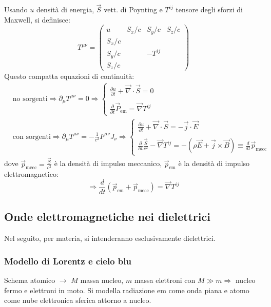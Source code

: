 \documentclass[10pt, a4paper]{scrartcl}
\numberwithin{equation}{subsection}
\theoremstyle{style1}
\begin{document}
Usando $u$ densit\`a di energia, $\vec{S}$ vett. di Poynting e $T^{ij} $ tensore degli sforzi di Maxwell, si definisce:
\begin{equation}
	T^{\mu \nu} = \begin{pmatrix} u & S_x / c & S_y / c & S_z / c\\
S_x / c & & & \\
S_y / c & & -T^{ij} & \\
S_z / c & & & \end{pmatrix}  
\end{equation}
Questo compatta equazioni di continuit\`a:
\begin{equation}
	\begin{split}
		&\text{no sorgenti} \Rightarrow \partial _\mu T^{\mu \nu} =  0 \Rightarrow \begin{cases}
		\displaystyle \frac{\partial u}{\partial t} + \vec{\nabla }\cdot \vec{S}=0\\
		\\
		\displaystyle \frac{\partial }{\partial t} \vec{P}_\text{em}=\vec{\nabla }T^{ij} 
	\end{cases}\\
		&\text{con sorgenti} \Rightarrow \partial _\mu T^{\mu  \nu} = -\frac{1}{c^2} F^{\mu \nu} J_\nu  \Rightarrow  \begin{cases}
			\displaystyle \frac{\partial u}{\partial t} + \vec{\nabla }\cdot \vec{S}= - \vec{j}\cdot \vec{E}\\
			\\
			\displaystyle \frac{\partial }{\partial t} \frac{\vec{S}}{c^2} - \vec{\nabla }T^{ij} = - (\rho \vec{E}+\vec{j}\times \vec{B}) \equiv \frac{d }{d t} \vec{p}_\text{mecc}
		\end{cases}
	\end{split}
\end{equation}
dove $\vec{p}_\text{mecc}=\frac{\vec{S}}{c^2}$ \`e la densit\`a di impulso meccanico, $\vec{p}_\text{em}$ \`e la densit\`a di impulso elettromagnetico:
\begin{equation}
	\Rightarrow \frac{d }{d t} (\vec{p}_\text{em}+\vec{p}_\text{mecc}) = \vec{\nabla }T^{ij} 
\end{equation}
\subsection{Onde elettromagnetiche nei dielettrici}
Nel seguito, per materia, si intenderanno esclusivamente dielettrici.
\subsubsection{Modello di Lorentz e cielo blu}\label{cielo}
Schema atomico $\to$ $M$ massa nucleo, $m$ massa elettroni con $M\gg m \Rightarrow $ nucleo fermo e elettroni in moto. Si modella radiazione em come onda piana e atomo come nube elettronica sferica attorno a nucleo. 
\end{document}
